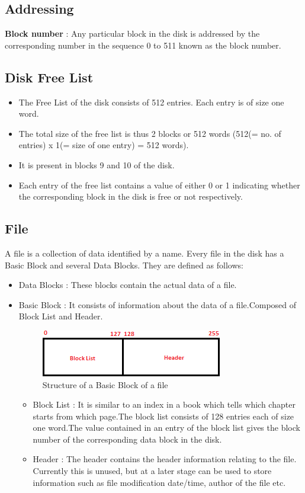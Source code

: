 \documentclass[11pt]{article}
\begin{document}
\subsection{Addressing}
\textbf{Block number} : Any particular block in the disk is addressed by the corresponding number in the sequence 0 to 511 known as the block number.

\subsection{Disk Free List}
\begin{itemize}
\item The Free List of the disk consists of 512 entries. Each entry is of size one word.
\item The total size of the free list is thus 2 blocks or 512 words (512(= no. of entries) x 1(= size of one entry) = 512 words).
\item It is present in blocks 9 and 10 of the disk.
\item Each entry of the free list contains a value of either 0 or 1 indicating whether the corresponding block in the disk is free or not respectively.
\end{itemize}


\subsection{File}
A file is a collection of data identified by a name. Every file in the disk has a Basic Block and several Data Blocks. They are defined as follows:
\begin{itemize}
\item Data Blocks : These blocks contain the actual data of a file.
\item Basic Block : It consists of information about the data of a file.Composed of Block List and Header.
 
 \begin{figure}[hbtp]
\begin{center}
\includegraphics[scale=0.5]{fileblock.png}
\end{center}
\caption{Structure of a Basic Block of a file}
\end{figure}
\begin{itemize}
 \item Block List : It is similar to an index in a book which tells which chapter starts from which page.The block list consists of 128 entries each of size one word.The value contained in an entry of the block list gives the block number of the corresponding data block in the disk.
 \item Header : The header contains the header information relating to the file. Currently this is unused, but at a later stage can be used to store information such as file modification date/time, author of the file etc.
 
 \end{itemize}
\end{itemize}
\end{document}
